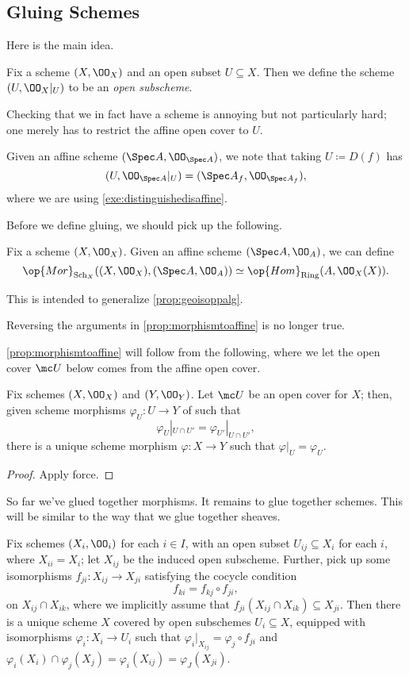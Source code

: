 \documentclass[../notes.tex]{subfiles}
\begin{document}
\subsection{Gluing Schemes}
Here is the main idea.
\begin{definition}
	Fix a scheme $(X,\OO_X)$ and an open subset $U\subseteq X$. Then we define the scheme $(U,\OO_X|_U)$ to be an \textit{open subscheme}.
\end{definition}
Checking that we in fact have a scheme is annoying but not particularly hard; one merely has to restrict the affine open cover to $U$.
\begin{example}
	Given an affine scheme $(\Spec A,\OO_{\Spec A})$, we note that taking $U\coloneqq D(f)$ has
	\[(U,\OO_{\Spec A}|_U)=(\Spec A_f,\OO_{\Spec A_f}),\]
	where we are using \autoref{exe:distinguishedisaffine}.
\end{example}
Before we define gluing, we should pick up the following.
\begin{proposition} \label{prop:morphismtoaffine}
	Fix a scheme $(X,\OO_X)$. Given an affine scheme $(\Spec A,\OO_A)$, we can define
	\[\op{Mor}_{\mathrm{Sch}_X}((X,\OO_X),(\Spec A,\OO_A))\simeq\op{Hom}_{\mathrm{Ring}}(A,\OO_X(X)).\]
\end{proposition}
This is intended to generalize \autoref{prop:geoisoppalg}.
\begin{remark}
	Reversing the arguments in \autoref{prop:morphismtoaffine} is no longer true.
\end{remark}
\autoref{prop:morphismtoaffine} will follow from the following, where we let the open cover $\mc U$ below comes from the affine open cover.
\begin{proposition}
	Fix schemes $(X,\OO_X)$ and $(Y,\OO_Y)$. Let $\mc U$ be an open cover for $X$; then, given scheme morphisms $\varphi_U\colon U\to Y$ of such that
	\[\varphi_U|_{U\cap U'}=\varphi_{U'}|_{U\cap U'},\]
	there is a unique scheme morphism $\varphi\colon X\to Y$ such that $\varphi|_U=\varphi_U$.
\end{proposition}
\begin{proof}
	Apply force.
\end{proof}
So far we've glued together morphisms. It remains to glue together schemes. This will be similar to the way that we glue together sheaves.
\begin{proposition}
	Fix schemes $(X_i,\OO_i)$ for each $i\in I$, with an open subset $U_{ij}\subseteq X_i$ for each $i$, where $X_{ii}=X_i$; let $X_{ij}$ be the induced open subscheme. Further, pick up some isomorphisms $f_{ji}\colon X_{ij}\to X_{ji}$ satisfying the cocycle condition
	\[f_{ki}=f_{kj}\circ f_{ji},\]
	on $X_{ij}\cap X_{ik}$, where we implicitly assume that $f_{ji}(X_{ij}\cap X_{ik})\subseteq X_{ji}$. Then there is a unique scheme $X$ covered by open subschemes $U_i\subseteq X$, equipped with isomorphisms $\varphi_i\colon X_i\to U_i$ such that $\varphi_i|_{X_{ij}}=\varphi_j\circ f_{ji}$ and $\varphi_i(X_i)\cap\varphi_j(X_j)=\varphi_i(X_{ij})=\varphi_J(X_{ji})$.
\end{proposition}
\end{document}
